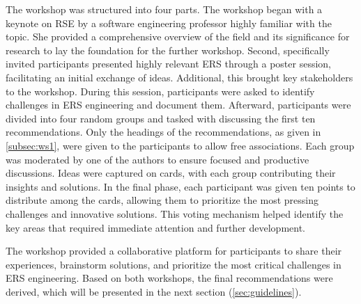 The workshop was structured into four parts. The workshop began with a keynote on \ac{RSE} by a software engineering professor highly familiar with the topic. She provided a comprehensive overview of the field and its significance for research to lay the foundation for the further workshop. Second, specifically invited participants presented highly relevant \ac{ERS} through a poster session, facilitating an initial exchange of ideas. Additional, this brought key stakeholders to the workshop. During this session, participants were asked to identify challenges in \ac{ERS} engineering and document them. Afterward, participants were divided into four random groups and tasked with discussing the first ten recommendations. Only the headings of the recommendations, as given in \ref{subsec:ws1}, were given to the participants to allow free associations. Each group was moderated by one of the authors to ensure focused and productive discussions. Ideas were captured on cards, with each group contributing their insights and solutions. In the final phase, each participant was given ten points to distribute among the cards, allowing them to prioritize the most pressing challenges and innovative solutions. This voting mechanism helped identify the key areas that required immediate attention and further development. 

The workshop provided a collaborative platform for participants to share their experiences, brainstorm solutions, and prioritize the most critical challenges in \ac{ERS} engineering. Based on both workshops, the final recommendations were derived, which will be presented in the next section (\ref{sec:guidelines}).
